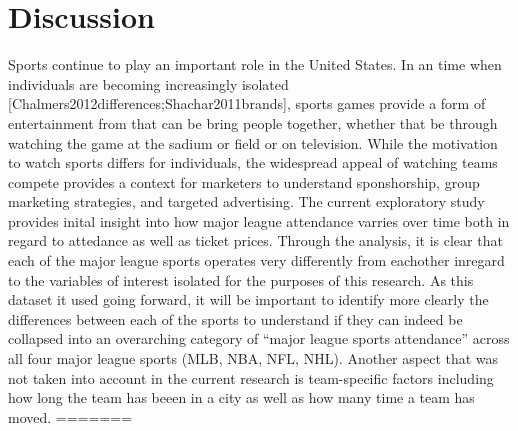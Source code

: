 \documentclass[man, fleqn, noextraspace,floatsintext]{apa6}
\newenvironment{Shaded}{\begin{snugshade}}{\end{snugshade}}
\newcommand{\DataTypeTok}[1]{\textcolor[rgb]{0.13,0.29,0.53}{#1}}
\newcommand{\DecValTok}[1]{\textcolor[rgb]{0.00,0.00,0.81}{#1}}
\newcommand{\KeywordTok}[1]{\textcolor[rgb]{0.13,0.29,0.53}{\textbf{#1}}}
\newcommand{\NormalTok}[1]{#1}
\newcommand{\OperatorTok}[1]{\textcolor[rgb]{0.81,0.36,0.00}{\textbf{#1}}}
\newcommand{\OtherTok}[1]{\textcolor[rgb]{0.56,0.35,0.01}{#1}}
\newcommand{\StringTok}[1]{\textcolor[rgb]{0.31,0.60,0.02}{#1}}
\begin{document}
\section{Discussion}\label{discussion}

Sports continue to play an important role in the United States. In an
time when individuals are becoming increasingly isolated
{[}Chalmers2012differences;Shachar2011brands{]}, sports games provide a
form of entertainment from that can be bring people together, whether
that be through watching the game at the sadium or field or on
television. While the motivation to watch sports differs for
individuals, the widespread appeal of watching teams compete provides a
context for marketers to understand sponshorship, group marketing
strategies, and targeted advertising. The current exploratory study
provides inital insight into how major league attendance varries over
time both in regard to attedance as well as ticket prices. Through the
analysis, it is clear that each of the major league sports operates very
differently from eachother inregard to the variables of interest
isolated for the purposes of this research. As this dataset it used
going forward, it will be important to identify more clearly the
differences between each of the sports to understand if they can indeed
be collapsed into an overarching category of \enquote{major league
sports attendance} across all four major league sports (MLB, NBA, NFL,
NHL). Another aspect that was not taken into account in the current
research is team-specific factors including how long the team has beeen
in a city as well as how many time a team has moved.
=======
\begin{Shaded}
\end{Shaded}
\end{document}

